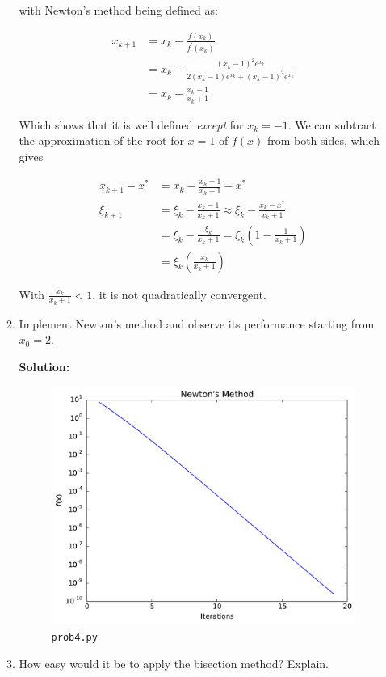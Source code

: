 \documentclass[12pt]{article}
\begin{document}
\begin{enumerate}
\begin{enumerate}
with Newton's method being defined as:

\begin{align*}
x_{k+1} &= x_{k} - \frac{f\left(x_{k}\right)}{f^{\prime}\left(x_{k}\right)}\\
        &= x_{k} - \frac{\left(x_{k}-1\right)^{2}e^{x_{k}}}{2\left(x_{k}-1\right)e^{x_{k}} + \left( x_{k} - 1\right)^{2}e^{x_{k}}}\\
        &= x_{k} - \frac{x_{k}-1}{x_{k} + 1}
\end{align*}

Which shows that it is well defined {\em except} for $x_{k} = -1$. We can subtract the approximation
of the root for $x = 1$ of $f(x)$ from both sides, which gives

\begin{align*}
x_{k+1} - x^{*} &= x_{k} - \frac{x_{k} - 1}{x_{k} + 1} - x^{*}\\
\xi_{k+1} &= \xi_{k} - \frac{x_{k}-1}{x_{k}+1} \approx \xi_{k} - \frac{x_{k} - x^{*}}{x_{k}+1}\\
          &= \xi_{k} - \frac{\xi_{k}}{x_{k}+1} = \xi_{k} \left( 1 - \frac{1}{x_{k}+1}\right)\\
          &= \xi_{k}\left( \frac{x_{k}}{x_{k}+1}\right)
\end{align*}

With $\frac{x_{k}}{x_{k}+1} < 1$, it is not quadratically convergent.

\item Implement Newton's method and observe its performance starting from $x_{0} = 2$.

{\bf Solution:}

\begin{figure}[H]
\centering
\includegraphics[width = .65\textwidth]{hw2_prob4.pdf}
\caption{{\tt prob4.py}}
\end{figure}

\item How easy would it be to apply the bisection method? Explain.


\end{enumerate}
\end{enumerate}
\end{document}
